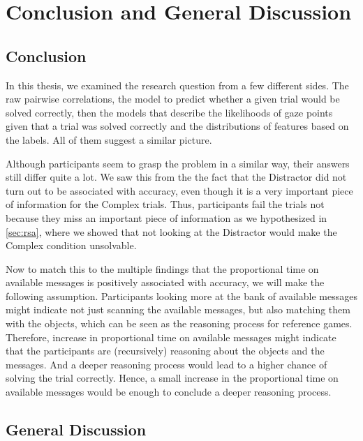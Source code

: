 ﻿\chapter{Conclusion and General Discussion}
\label{chap:conclusion}

\section{Conclusion}
\label{sec:conclusion}

In this thesis, we examined the research question from a few different sides. The raw pairwise correlations, the model to predict whether a given trial would be solved correctly, then the models that describe the likelihoods of gaze points given that a trial was solved correctly and the distributions of features based on the labels. All of them suggest a similar picture. 

Although participants seem to grasp the problem in a similar way, their answers still differ quite a lot. We saw this from the the fact that the Distractor did not turn out to be associated with accuracy, even though it is a very important piece of information for the Complex trials. Thus, participants fail the trials not because they miss an important piece of information as we hypothesized in \autoref{sec:rsa}, where we showed that not looking at the Distractor would make the Complex condition unsolvable. 

Now to match this to the multiple findings that the proportional time on available messages is positively associated with accuracy, we will make the following assumption. Participants looking more at the bank of available messages might indicate not just scanning the available messages, but also matching them with the objects, which can be seen as the reasoning process for reference games. Therefore, increase in proportional time on available messages might indicate that the participants are (recursively) reasoning about the objects and the messages. And a deeper reasoning process would lead to a higher chance of solving the trial correctly. Hence, a small increase in the proportional time on available messages would be enough to conclude a deeper reasoning process.



\section{General Discussion}
\label{sec:general-discussion}

